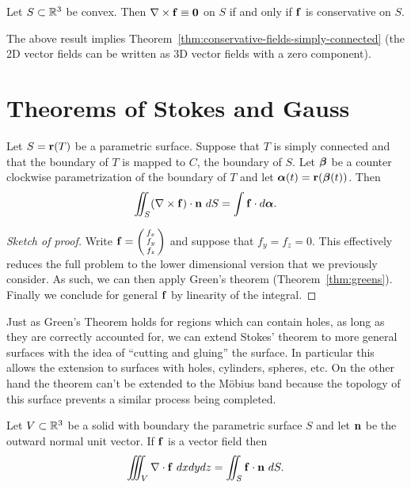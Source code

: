 \begin{theorem}
    Let \(S\subset \mathbb{R}^3\) be convex. Then \(\nabla \times \mathbf{f} \equiv \mathbf{0}\) on \(S\) if and only if \(\mathbf{f}\) is conservative on \(S\).
\end{theorem}

The above result implies Theorem~\ref{thm:conservative-fields-simply-connected} (the 2D vector fields can be written as 3D vector fields with a zero component).

\section{Theorems of Stokes and Gauss}

\begin{theorem}[Stokes]
    Let \(S=\mathbf{r}(T)\) be a parametric surface.
    Suppose that \(T\) is simply connected and that the boundary of \(T\) is mapped to \(C\), the boundary of \(S\).
    Let \(\boldsymbol{\beta}\) be a counter clockwise parametrization of the boundary of \(T\) and let \(\boldsymbol{\alpha}(t) = \mathbf{r}(\boldsymbol{\beta}(t))\).
    Then
    \[
        \iint_{S} (\nabla \times \mathbf{f}) \cdot \mathbf{n} \ dS = \int \mathbf{f} \cdot d\boldsymbol{\alpha}.
    \]
\end{theorem}


\begin{proof}[Sketch of proof]
    Write \(\mathbf{f} = \left(\begin{smallmatrix}
            f_x \\ f_y \\ f_z
        \end{smallmatrix}\right)\)
    and suppose that \(f_y = f_z = 0\).
    This effectively reduces the full problem to the lower dimensional version that we previously consider.
    As such, we can then apply Green's theorem (Theorem~\ref{thm:greens}).
    Finally we conclude for general \(\mathbf{f}\) by linearity of the integral.
\end{proof}

Just as Green's Theorem holds for regions which can contain holes, as long as they are correctly accounted for, we can extend Stokes' theorem to more general surfaces with the idea of ``cutting and gluing'' the surface.
In particular this allows the extension to surfaces with holes, cylinders, spheres, etc.
On the other hand the theorem can't be extended to the Möbius band because the topology of this surface prevents a similar process being completed.

\begin{theorem}[Gauss]
    Let \(V \subset \mathbb{R}^3\) be a solid with boundary the parametric surface \(S\) and let \(\mathbf{n}\) be the outward normal unit vector.
    If \(\mathbf{f}\) is a vector field then
    \[
        \iiint_{V} \nabla \cdot \mathbf{f} \ dx dy dz = \iint_{S} \mathbf{f} \cdot \mathbf{n} \ dS.
    \]
\end{theorem}


